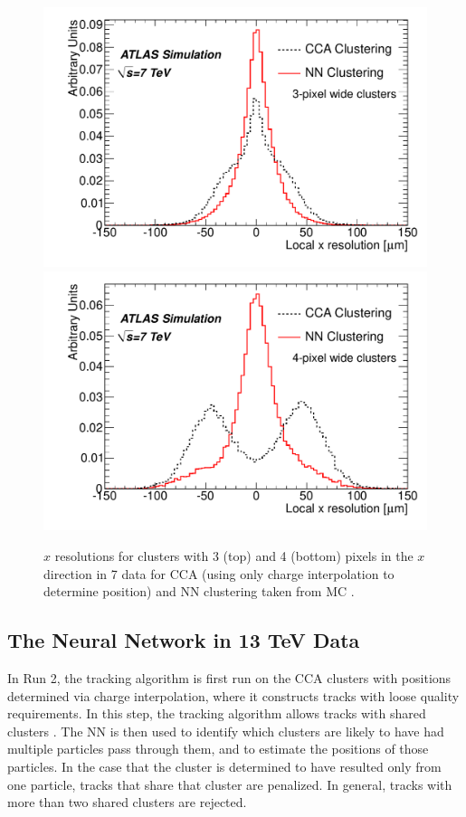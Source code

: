 \begin{centering}
\begin{figure}[!htb]
\myfloatalign
\includegraphics[width=.9\linewidth]{figures/nn/3x_res.pdf}
\includegraphics[width=.9\linewidth]{figures/nn/4x_res.pdf}
\caption{$x$ resolutions for clusters with 3 (top) and 4 (bottom) pixels in the $x$ direction in 7 \tev data for \ac{CCA} (using only charge interpolation to determine position) and \ac{NN} clustering taken from \ac{MC} \cite{PERF-2012-05}.}
\label{fig:7tev_res}
\end{figure}
\end{centering}

\subsection{The Neural Network in 13 TeV Data}

In Run 2, the tracking algorithm is first run on the \ac{CCA} clusters with positions determined via charge interpolation, where it constructs tracks with loose quality requirements. In this step, the tracking algorithm allows tracks with shared clusters \cite{ATL-PHYS-PUB-2015-044}. The \ac{NN} is then used to identify which clusters are likely to have had multiple particles pass through them, and to estimate the positions of those particles. In the case that the cluster is determined to have resulted only from one particle, tracks that share that cluster are penalized. In general, tracks with more than two shared clusters are rejected.

